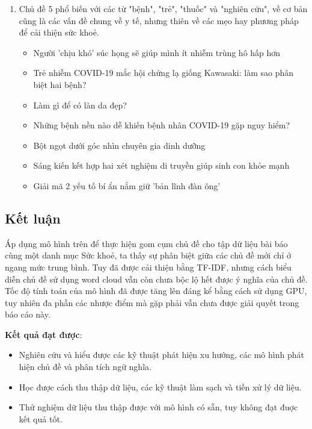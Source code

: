 \begin{enumerate}
    \item Chủ đề 5 phổ biến với các từ "bệnh", "trẻ", "thuốc" và "nghiên cứu",
        về cơ bản cũng là các vấn đề chung về y tế, nhưng thiên về các mẹo hay phương pháp để cải thiện sức khoẻ.
        \begin{itemize}
            \item Người 'chịu khó' súc họng sẽ giúp mình ít nhiễm trùng hô hấp hơn
            \item Trẻ nhiễm COVID-19 mắc hội chứng lạ giống Kawasaki: làm sao phân biệt hai bệnh?
            \item Làm gì để có làn da đẹp?
            \item Những bệnh nền nào dễ khiến bệnh nhân COVID-19 gặp nguy hiểm?
            \item Bột ngọt dưới góc nhìn chuyên gia dinh dưỡng
            \item Sáng kiến kết hợp hai xét nghiệm di truyền giúp sinh con khỏe mạnh
            \item Giải mã 2 yếu tố bí ẩn nắm giữ 'bản lĩnh đàn ông'
        \end{itemize}
\end{enumerate}







\subsection{Kết luận}
Áp dụng mô hình trên để thực hiện gom cụm chủ đề cho tập dữ liệu bài báo cùng
một danh mục Sức khoẻ, ta thấy sự phân biệt giữa các chủ đề mới chỉ ở ngang mức
trung bình. Tuy đã được cải thiện bằng TF-IDF, nhưng cách biểu diễn chủ đề sử
dụng word cloud vẫn còn chưa bộc lộ hết được ý nghĩa của chủ đề. Tốc độ tính
toán của mô hình đã được tăng lên đáng kể bằng cách sử dụng GPU, tuy nhiên đa
phần các nhược điểm mà \cite{lamGomCumVan2021} gặp phải vẫn chưa được giải
quyết trong báo cáo này.

\textbf{Kết quả đạt được}:
\begin{itemize}
    \item Nghiên cứu và hiểu được các kỹ thuật phát hiện xu hướng, các mô hình
        phát hiện chủ đề và phân tích ngữ nghĩa.
    \item Học được cách thu thập dữ liệu, các kỹ thuật làm sạch và tiền xử lý
        dữ liệu.
    \item Thử nghiệm dữ liệu thu thập được với mô hình có sẵn, tuy không đạt
        đuợc kết quả tốt.
\end{itemize}
